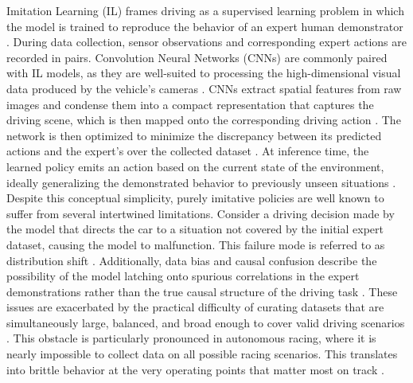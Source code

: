 Imitation Learning (IL) frames driving as a supervised learning problem in which the model is trained to reproduce the behavior of an expert human demonstrator \cite{tampuu_SurveyEndtoEndDriving_2022, hu_review_2026, chib_recent_2023}.
During data collection, sensor observations and corresponding expert actions are recorded in pairs.
Convolution Neural Networks (CNNs) are commonly paired with IL models, as they are well-suited to processing the high-dimensional visual data produced by the vehicle's cameras \cite{bojarski_EndtoEndLearningSelfDriving_2016, kocic_end-to-end_2019, lee_autonomous_2020, hu_learning_2021}.
CNNs extract spatial features from raw images and condense them into a compact representation that captures the driving scene, which is then mapped onto the corresponding driving action \cite{kocic_end-to-end_2019, hu_learning_2021}.
The network is then optimized to minimize the discrepancy between its predicted actions and the expert's over the collected dataset \cite{hu_review_2026, tampuu_SurveyEndtoEndDriving_2022}.
At inference time, the learned policy emits an action based on the current state of the environment, ideally generalizing the demonstrated behavior to previously unseen situations \cite{tampuu_SurveyEndtoEndDriving_2022, kocic_end-to-end_2019}.
Despite this conceptual simplicity, purely imitative policies are well known to suffer from several intertwined limitations.
Consider a driving decision made by the model that directs the car to a situation not covered by the initial expert dataset, causing the model to malfunction.
This failure mode is referred to as distribution shift \cite{ross_ReductionImitationLearning_2011, tampuu_SurveyEndtoEndDriving_2022, wang_VersatileEfficientReinforcement_2022}.
Additionally, data bias and causal confusion describe the possibility of the model latching onto spurious correlations in the expert demonstrations rather than the true causal structure of the driving task \cite{hu_review_2026, tampuu_SurveyEndtoEndDriving_2022, wang_VersatileEfficientReinforcement_2022, chib_recent_2023}.
These issues are exacerbated by the practical difficulty of curating datasets that are simultaneously large, balanced, and broad enough to cover valid driving scenarios \cite{wang_VersatileEfficientReinforcement_2022, chib_recent_2023}.
This obstacle is particularly pronounced in autonomous racing, where it is nearly impossible to collect data on all possible racing scenarios.
This translates into brittle behavior at the very operating points that matter most on track \cite{wang_VersatileEfficientReinforcement_2022, ogretmen_local_2025}.

